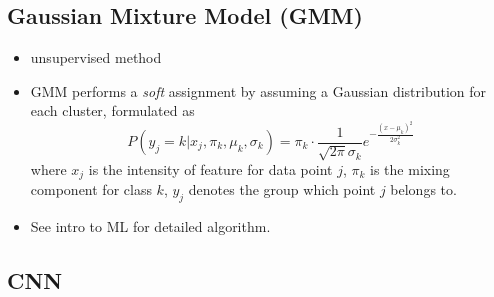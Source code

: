 \documentclass[twocolumn,landscape,10pt]{article}
\theoremstyle{definition}
\begin{document}
\subsection{Gaussian Mixture Model (GMM)}

\begin{itemize}
    \item unsupervised method
    \item GMM performs a \emph{soft} assignment by assuming a Gaussian
        distribution for each cluster, formulated as
        \[
            P(y_j=k|x_j,\pi_k,\mu_k,\sigma_k)=
            \pi_k\cdot \frac{1}{\sqrt{2\pi}\sigma_k}
            e^{-\frac{{(x-\mu_k)}^{2}}{2\sigma^2_k}}
        \]
        where $x_j$ is the intensity of feature for data point $j$,
        $\pi_k$ is the mixing component for class $k$, $y_j$ denotes the group
        which point $j$ belongs to.
    \item See intro to ML for detailed algorithm.
\end{itemize} 

\subsection{CNN}
\end{document}
